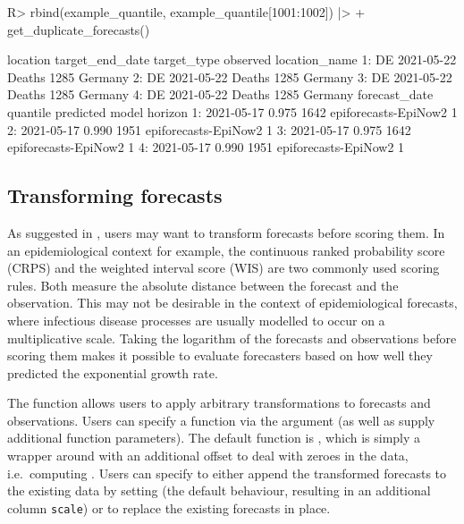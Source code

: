 \documentclass[
]{jss}
\begin{document}
\begin{CodeChunk}
\begin{CodeInput}
R> rbind(example_quantile, example_quantile[1001:1002]) |>
+   get_duplicate_forecasts() 
\end{CodeInput}
\begin{CodeOutput}
   location target_end_date target_type observed location_name
1:       DE      2021-05-22      Deaths     1285       Germany
2:       DE      2021-05-22      Deaths     1285       Germany
3:       DE      2021-05-22      Deaths     1285       Germany
4:       DE      2021-05-22      Deaths     1285       Germany
   forecast_date quantile predicted                model horizon
1:    2021-05-17    0.975      1642 epiforecasts-EpiNow2       1
2:    2021-05-17    0.990      1951 epiforecasts-EpiNow2       1
3:    2021-05-17    0.975      1642 epiforecasts-EpiNow2       1
4:    2021-05-17    0.990      1951 epiforecasts-EpiNow2       1
\end{CodeOutput}
\end{CodeChunk}

\subsection{Transforming forecasts}\label{transforming-forecasts}

As suggested in \citep{bosseScoringEpidemiologicalForecasts2023}, users
may want to transform forecasts before scoring them. In an
epidemiological context for example, the continuous ranked probability
score (CRPS) and the weighted interval score (WIS) are two commonly used
scoring rules. Both measure the absolute distance between the forecast
and the observation. This may not be desirable in the context of
epidemiological forecasts, where infectious disease processes are
usually modelled to occur on a multiplicative scale. Taking the
logarithm of the forecasts and observations before scoring them makes it
possible to evaluate forecasters based on how well they predicted the
exponential growth rate.

The function  allows users to apply
arbitrary transformations to forecasts and observations. Users can
specify a function via the argument  (as well as supply
additional function parameters). The default function is
, which is simply a wrapper around  with
an additional offset to deal with zeroes in the data, i.e.~computing
. Users can specify to either append the
transformed forecasts to the existing data by setting
 (the default behaviour, resulting in an additional
column \texttt{scale}) or to replace the existing forecasts in place.
\end{document}

